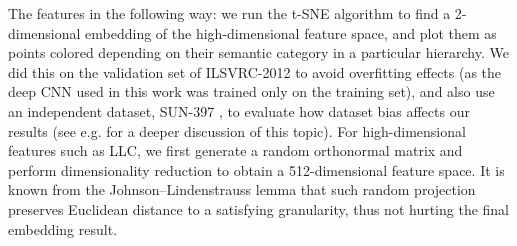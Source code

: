 The features in the following way: we run the t-SNE algorithm \cite{tsne} to find a 2-dimensional embedding of the high-dimensional feature space, and plot them as points colored depending on their semantic category in a particular hierarchy. We did this on the validation set of ILSVRC-2012 to avoid overfitting effects (as the deep CNN used in this work was trained only on the training set), and also use an independent dataset, SUN-397 \cite{xiao10}, to evaluate how dataset bias affects our results (see e.g. \cite{torralba_cvpr11} for a deeper discussion of this topic). For high-dimensional features such as LLC, we first generate a random orthonormal matrix and perform dimensionality reduction to obtain a 512-dimensional feature space. It is known from the Johnson–Lindenstrauss lemma that such random projection preserves Euclidean distance to a satisfying granularity, thus not hurting the final embedding result.


